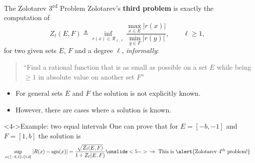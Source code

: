 \documentclass[aspectratio=169,xcolor=dvipsnames]{beamer}
\begin{document}
	\begin{frame}{The Zolotarev 3\textsuperscript{rd} Problem}
	Zolotarev's \textbf{third problem} is exactly the computation of 
	\[
	Z_\ell(E, F) \triangleq \inf_{r(x) \in \mathcal R_{\ell,\ell}}
	\frac{\max_{x \in E} |r(x)|}{\min_{y \in F} |r(y)|}, \qquad
	\ell \geq 1, 
	\]
	for two given sets $E$, $F$ and a degree $\ell$, \emph{informally}:
	\begin{quote}
		``Find a rational function that is as small as possible on a set $E$ while being $\geq 1$ in absolute value on another set $F$''
	\end{quote}

	\begin{itemize}
		\item[\alert{\faSadCry}]<2-> For \alert{general sets} $E$ and $F$ the solution is \alert{not explicitly known}.
		\item[\textcolor{Goldenrod}{\faSadTear}]<3-> However, there are cases where a solution is known.
	\end{itemize}

	\begin{exampleblock}<4->{Example: two equal intervals}
	One can prove that for $E = [-b,-1]$ and $F=[1,b]$ the solution is\vspace{-0.8em}
	\[
	\sup_{x \in [-b,1]\cup[1,b]} |R(x) - \operatorname{sgn}(x)| = \frac{\sqrt{Z_\ell(E,F)}}{1 + Z_\ell(E,F)} \onslide<5->{\;\Rightarrow\;\text{This is \alert{Zolotarev 4\textsuperscript{th}  problem!}} }
	\]
	\end{exampleblock}

	\end{frame}
\end{document}
